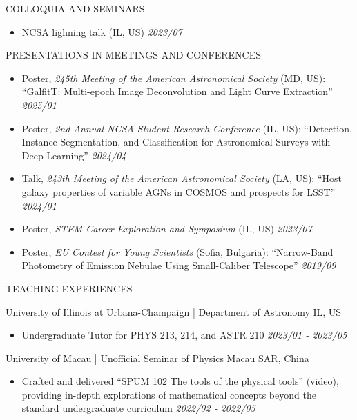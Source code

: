 \documentclass[11pt]{article} %
\begin{document}
\begin{section}{COLLOQUIA AND SEMINARS}

\begin{itemize}[leftmargin=1.5em]
    \item NCSA lighning talk (IL, US) \hfill \textit{2023/07} 
\end{itemize}

\end{section}

\begin{section}{PRESENTATIONS IN MEETINGS AND CONFERENCES}

\begin{itemize}[leftmargin=1.5em]
    \item Poster, \textit{245th Meeting of the American Astronomical Society} (MD, US): ``GalfitT: Multi-epoch Image Deconvolution and Light Curve Extraction'' \hfill \textit{2025/01} 
    \item Poster, \textit{2nd Annual NCSA Student Research Conference} (IL, US): ``Detection, Instance Segmentation, and Classification for Astronomical Surveys with Deep Learning'' \hfill \textit{2024/04} 
    \item Talk, \textit{243th Meeting of the American Astronomical Society} (LA, US): ``Host galaxy properties of variable AGNs in COSMOS and prospects for LSST'' \hfill \textit{2024/01} 
    \item Poster, \textit{STEM Career Exploration and Symposium} (IL, US) \hfill \textit{2023/07} 
    \item Poster, \textit{EU Contest for Young Scientists} (Sofia, Bulgaria): ``Narrow-Band Photometry of Emission Nebulae Using Small-Caliber Telescope'' \hfill \textit{2019/09} 
\end{itemize}

\end{section}

\begin{section}{TEACHING EXPERIENCES}

University of Illinois at Urbana-Champaign | Department of Astronomy \hfill IL, US
\begin{itemize}[leftmargin=1.5em]
    \item Undergraduate Tutor for PHYS 213, 214, and ASTR 210 \hfill \textit{2023/01 - 2023/05}
\end{itemize}

University of Macau | Unofficial Seminar of Physics \hfill Macau SAR, China
\begin{itemize}[leftmargin=1.5em]
    \item Crafted and delivered ``\href{https://github.com/Chisen-Lupus/Seminar-of-Physics-UM/blob/main/SPUM%20102%20The%20tools%20of%20physical%20tool.pdf}{SPUM 102 The tools of the physical tools}'' (\href{https://www.youtube.com/watch?v=nQkv03r-XeQ&list=PLV9fHDZW7hHWQ9rrAk7c9kdeV-Lqyt7pV&index=10}{video}), providing in-depth explorations of mathematical concepts beyond the standard undergraduate curriculum \hfill \textit{2022/02 - 2022/05}
\end{itemize}

\end{section}
\end{document}

